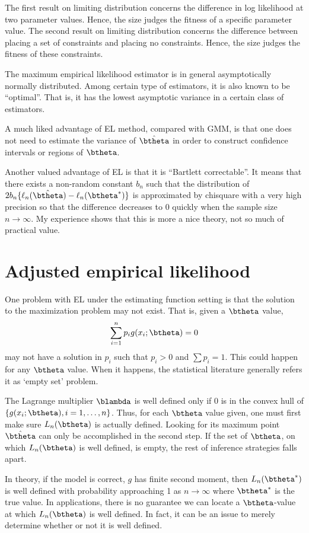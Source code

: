 The first result on limiting distribution concerns the difference
in log likelihood at two parameter values. Hence, the size judges
the fitness of a specific parameter value.
The second result on limiting distribution concerns
the difference between placing a set of constraints and
placing no constraints. Hence, the size judges the
fitness of these constraints.

The maximum empirical likelihood estimator is in general
asymptotically normally distributed. Among certain type of
estimators, it is also known to be ``optimal''. That is, it has
the lowest asymptotic variance in a certain class of estimators.

A much liked advantage of EL method, compared with GMM,
is that one does not need to estimate the variance of $\hat \btheta$
in order to construct confidence intervals or regions of $\btheta$.

Another valued advantage of EL is that it is ``Bartlett correctable''.
It means that there exists a non-random constant $b_n$ such that the
distribution of $2 b_n\{\ell_n(\hat \btheta) - \ell_n(\btheta^*)\}$
is approximated by chisquare with a very high precision so that the
difference decreases to 0 quickly when the sample size $n \to \infty$.
My experience shows that this is more a nice theory, not so much
of practical value.


\section{Adjusted empirical likelihood}

One problem with EL under the estimating function setting is that the
solution to the maximization problem may not exist. That is,
given a $\btheta$ value, 
\[
\sum_{i=1}^n p_i g(x_i; \btheta) = 0
\]
may not have a solution in $p_i$ such that $p_i > 0$ and $\sum p_i = 1$.
This could happen for any $\btheta$ value. When it happens,
the statistical literature generally refers it as `empty set' problem.

The Lagrange multiplier $\blambda$ is well defined only if $0$ is
in the convex hull of $\{ g(x_i; \btheta), i=1, \ldots, n\}$.
Thus, for each $\btheta$ value given, one must first make sure
$L_n(\btheta)$ is actually defined. Looking for its maximum
point $\hat \btheta$ can only be accomplished in the second step. 
If the set of $\btheta$, on which $L_n(\btheta)$ is well
defined, is empty, the rest of inference strategies falls apart.

In theory, if the model is correct, $g$ has finite second moment,
then $L_n(\btheta^*)$ is well defined with probability approaching 1
as $n \to \infty$ where $\btheta^*$ is the true value. 
In applications, there is no guarantee we can
locate a $\btheta$-value at which $L_n(\btheta)$ is well defined.
In fact, it can be an issue to merely determine whether or not
it is well defined.

